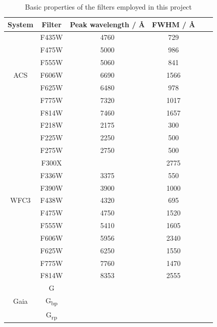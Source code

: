 \documentclass[12pt, a4paper]{report}
\begin{document}
\begin{table}
\begin{center}
\begin{tabular}{cccccc}
\hline
System & Filter & Peak wavelength / \AA & FWHM / \AA \\
\hline

& F435W & 4760 & 729 \\
& F475W & 5000 & 986 \\
& F555W & 5060 & 841 \\
ACS & F606W & 6690 & 1566 \\
& F625W & 6480 & 978 \\
& F775W & 7320 & 1017 \\
& F814W & 7460 & 1657 \\
\hline
& F218W & 2175 & 300 \\
& F225W & 2250 & 500 \\
& F275W & 2750 & 500 \\
& F300X &  & 2775 \\
& F336W & 3375 & 550 \\
& F390W & 3900 & 1000 \\
WFC3 & F438W & 4320 & 695 \\
& F475W & 4750 & 1520 \\
& F555W & 5410 & 1605 \\
& F606W & 5956 & 2340 \\
& F625W & 6250 & 1550 \\
& F775W & 7760 & 1470 \\
& F814W & 8353 & 2555 \\
\hline
& G &  &  \\
Gaia & G\textsubscript{bp} &  &  \\
& G\textsubscript{rp} &  &  \\
\hline

\end{tabular}
\caption{Basic properties of the filters employed in this project}
\label{filter_basics}
\end{center}
\end{table}
\end{document}
